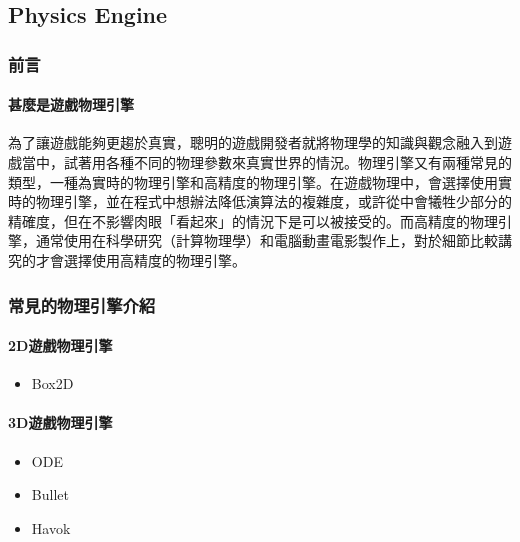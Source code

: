\subsection{Physics Engine}
\label{sub:Physics Engine}

\subsubsection{前言}

\paragraph{甚麼是遊戲物理引擎}

為了讓遊戲能夠更趨於真實，聰明的遊戲開發者就將物理學的知識與觀念融入到遊戲當中，試著用各種不同的物理參數來真實世界的情況。物理引擎又有兩種常見的類型，一種為實時的物理引擎和高精度的物理引擎。在遊戲物理中，會選擇使用實時的物理引擎，並在程式中想辦法降低演算法的複雜度，或許從中會犧牲少部分的精確度，但在不影響肉眼「看起來」的情況下是可以被接受的。而高精度的物理引擎，通常使用在科學研究（計算物理學）和電腦動畫電影製作上，對於細節比較講究的才會選擇使用高精度的物理引擎。

\subsubsection{常見的物理引擎介紹}

\paragraph{2D遊戲物理引擎}
\begin{itemize}
    \item{Box2D}
\end{itemize}

\paragraph{3D遊戲物理引擎}
\begin{itemize}
    \item{ODE}
    \item{Bullet}
    \item{Havok}
\end{itemize}

